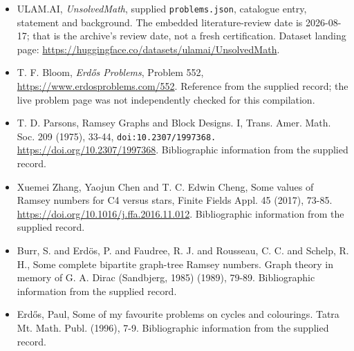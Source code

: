 \documentclass[11pt,a4paper]{article}
\begin{document}
{\small

\begin{itemize}

\item[\hypertarget{source:statement:1}{S1}] ULAM.AI, \emph{UnsolvedMath}, supplied \texttt{problems.json}, catalogue entry, statement and background. The embedded literature-review date is 2026-08-17; that is the archive’s review date, not a fresh certification. Dataset landing page: \url{https://huggingface.co/datasets/ulamai/UnsolvedMath}.

\item[\hypertarget{source:statement:2}{S2}] T. F. Bloom, \emph{Erdős Problems}, Problem 552, \url{https://www.erdosproblems.com/552}. Reference from the supplied record; the live problem page was not independently checked for this compilation.

\item[\hypertarget{source:statement:3}{S3}] T. D. Parsons, Ramsey Graphs and Block Designs. I, Trans. Amer. Math. Soc. 209 (1975), 33-44, \nolinkurl{doi:10.2307/1997368.} \url{https://doi.org/10.2307/1997368}. Bibliographic information from the supplied record.

\item[\hypertarget{source:statement:4}{S4}] Xuemei Zhang, Yaojun Chen and T. C. Edwin Cheng, Some values of Ramsey numbers for C4 versus stars, Finite Fields Appl. 45 (2017), 73-85. \url{https://doi.org/10.1016/j.ffa.2016.11.012}. Bibliographic information from the supplied record.

\item[\hypertarget{source:statement:5}{S5}] Burr, S. and Erd\"{o}s, P. and Faudree, R. J. and Rousseau, C. C. and Schelp, R. H., Some complete bipartite graph-tree Ramsey numbers. Graph theory in memory of G. A. Dirac (Sandbjerg, 1985) (1989), 79-89. Bibliographic information from the supplied record.

\item[\hypertarget{source:statement:6}{S6}] Erd\H{o}s, Paul, Some of my favourite problems on cycles and colourings. Tatra Mt. Math. Publ. (1996), 7-9. Bibliographic information from the supplied record.

\end{itemize}

}

\label{end:statement}
\end{document}
